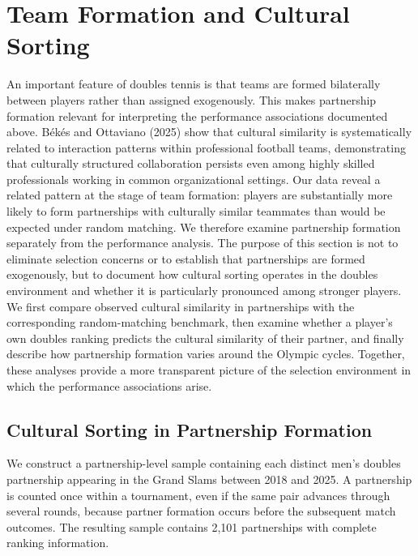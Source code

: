 \documentclass[10pt]{article}
\begin{document}
\section{Team Formation and Cultural Sorting}
An important feature of doubles tennis is that teams are formed bilaterally between players rather than assigned exogenously. This makes partnership formation relevant for interpreting the performance associations documented above. Békés and Ottaviano (2025) show that cultural similarity is systematically related to interaction patterns within professional football teams, demonstrating that culturally structured collaboration persists even among highly skilled professionals working in common organizational settings. Our data reveal a related pattern at the stage of team formation: players are substantially more likely to form partnerships with culturally similar teammates than would be expected under random matching. We therefore examine partnership formation separately from the performance analysis. The purpose of this section is not to eliminate selection concerns or to establish that partnerships are formed exogenously, but to document how cultural sorting operates in the doubles environment and whether it is particularly pronounced among stronger players. We first compare observed cultural similarity in partnerships with the corresponding random-matching benchmark, then examine whether a player's own doubles ranking predicts the cultural similarity of their partner, and finally describe how partnership formation varies around the Olympic cycles. Together, these analyses provide a more transparent picture of the selection environment in which the performance associations arise.

\subsection{Cultural Sorting in Partnership Formation}
\label{sec:sorting}


We construct a partnership-level sample containing each distinct men's doubles partnership appearing in the Grand Slams between 2018 and 2025. A partnership is counted once within a tournament, even if the same pair advances through several rounds, because partner formation occurs before the subsequent match outcomes. The resulting sample contains 2,101 partnerships with complete ranking information.
\end{document}
